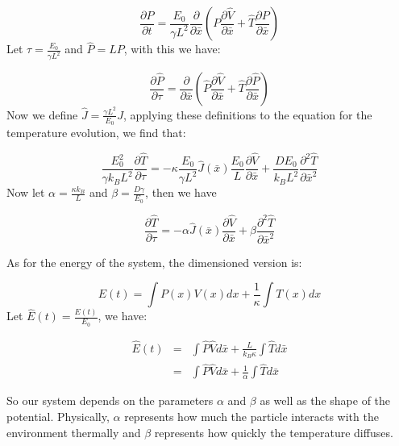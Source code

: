 \begin{equation}
\frac{\partial P}{\partial t} = \frac{E_0}{\gamma L^2} \frac{\partial}{\partial \bar{x}} \left (P \frac{\partial \hat{V}}{\partial \bar{x}} + \hat{T} \frac{\partial P}{\partial \bar{x}} \right )
\end{equation}
Let $\tau = \frac{E_0}{\gamma L^2}$ and $\hat{P} = L P $, with this we have:

\begin{equation}
\frac{\partial \hat{P}}{\partial \tau} = \frac{\partial}{\partial \bar{x}} \left (\hat{P} \frac{\partial \hat{V}}{\partial \bar{x}} + \hat{T}  \frac{\partial \hat{P}}{\partial \bar{x}} \right ) \label{eqn:dimensionlessSmoluchowski}
\end{equation}
Now we define $\hat{J} = \frac{\gamma L^2}{E_0} J $, applying these definitions to the equation for the temperature evolution, we find that:

\begin{equation}
\frac{E_0^2}{\gamma k_B L^2} \frac{\partial \hat{T}}{\partial \tau} = -\kappa \frac{E_0}{\gamma L^2}\hat{J}(\bar{x}) \frac{E_0}{L} \frac{\partial \hat{V}}{\partial \bar{x}} + \frac{D E_0}{k_B L^2} \frac{\partial^2 \hat{T}}{\partial \bar{x}^2}
\end{equation}
Now let $\alpha = \frac{\kappa k_B}{L}$ and $\beta = \frac{D \gamma}{E_0}$, then we have

\begin{equation}
\frac{\partial \hat{T}}{\partial \tau} = -\alpha \hat{J}(\bar{x}) \frac{\partial \hat{V}}{\partial \bar{x}} + \beta \frac{\partial^2 \hat{T}}{\partial \bar{x}^2} \label{eqn:dimensionlessHeat}
\end{equation}

As for the energy of the system, the dimensioned version is:

\begin{equation}
E(t) = \int P(x) V(x) dx + \frac{1}{\kappa} \int T(x) dx
\end{equation}
Let $\hat{E}(t) = \frac{E(t)}{E_0}$, we have:

\begin{eqnarray}
\hat{E}(t) & = & \int \hat{P} \hat{V} d \bar{x} + \frac{L}{k_B \kappa} \int \hat{T} d\bar{x} \\
              & = & \int \hat{P} \hat{V} d \bar{x} + \frac{1}{\alpha} \int \hat{T} d\bar{x}
\end{eqnarray}


So our system depends on the parameters $\alpha$ and $\beta$ as well as the shape of the potential. Physically, $\alpha$ represents how much the particle interacts with the environment thermally and $\beta$ represents how quickly the temperature diffuses.

